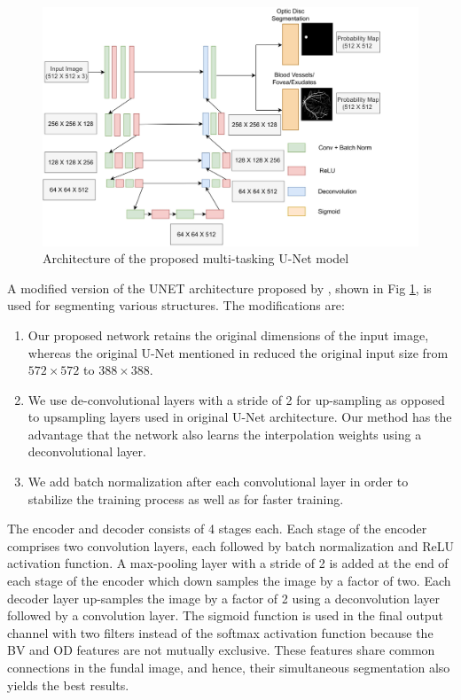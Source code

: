 \documentclass[utf8]{FrontiersinHarvard} %
\begin{document}
\begin{figure}
\centering
\includegraphics[width=0.9\linewidth]{images/UnetArch.jpg}
\caption{Architecture of the proposed multi-tasking U-Net model}
\label{unet_combined}
\end{figure}

A modified version of the UNET architecture proposed by \cite{ronneberger2015u}, shown in Fig \ref{unet_combined}, is used for segmenting various structures. The modifications are:
\begin{enumerate}
\item Our proposed network retains the original dimensions of the input image, whereas the original U-Net mentioned in \cite{ronneberger2015u} reduced the original  input size from $572 \times 572$ to $388 \times 388$.

\item We use de-convolutional layers with a stride of 2 for up-sampling as opposed to  upsampling layers used in original U-Net architecture. Our method has the advantage that the network also learns the interpolation weights using a deconvolutional layer.
\item We add batch normalization after each convolutional layer in order to stabilize the training process as well as for faster training.
\end{enumerate}

The encoder and decoder consists of 4 stages each. Each stage of the encoder comprises two convolution layers, each followed by batch normalization and ReLU activation function. A max-pooling layer with a stride of 2 is added at the end of each stage of the encoder which down samples the image by a factor of two.
Each decoder layer up-samples the image by a factor of 2 using  a deconvolution layer followed by a convolution layer. The sigmoid function is used in the final output channel with two filters instead of the softmax activation function because the BV and OD features are not  mutually exclusive. These features share common connections in the fundal image, and hence, their simultaneous segmentation also yields the best results.
\end{document}

